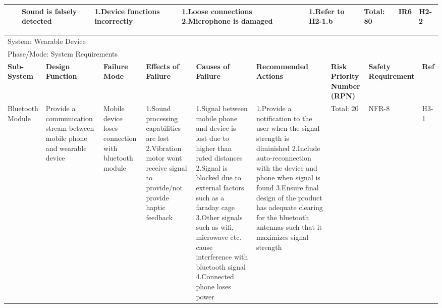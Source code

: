 \documentclass{article}
\begin{document}
\begin{landscape}
\begin{table}[H]
\begin{tabular}{| p{} | p{}  | p{} | p{} | p{} | p{} | p{} | p{} | p{} |}
         & & Sound is falsely detected & 1.Device functions incorrectly & 1.Loose connections \newline 2.Microphone is damaged & 1.Refer to H2-1.b & Total: 80 & IR6 & H2-2 \\ \hline
     
        \end{tabular}
        \hspace*{-1cm}
\end{table}
\begin{table}[H]
    \centering
        
        \begin{tabular}{| p{} | p{}  | p{} | p{} | p{} | p{} | p{} | p{} | p{} |}
        \hline
        
        \multicolumn{9}{|l|}{System: Wearable Device} \\
        \multicolumn{9}{|l|}{Phase/Mode: System Requirements} \\ \hline
        \textbf{Sub-System} & \textbf{Design Function} & \textbf{Failure Mode} & \textbf{Effects of Failure} & \textbf{Causes of Failure} & \textbf{Recommended Actions} & \textbf{Risk Priority Number (RPN)} & \textbf{Safety Requirement} & \textbf{Ref} \\ \hline
    
         Bluetooth Module & Provide a communication stream between mobile phone and wearable device & Mobile device loses connection with  bluetooth module & 1.Sound processing capabilities are lost \newline 2.Vibration motor wont receive signal to provide/not provide haptic feedback  & 1.Signal between mobile phone and  device is lost due to higher than rated distances \newline 2.Signal is blocked due to external factors such as a faraday cage \newline 3.Other signals such as wifi, microwave etc. cause interference with bluetooth signal \newline 4.Connected phone loses power  & 1.Provide a notification to the user when the signal strength is diminished \newline 2.Include auto-reconnection with the device and phone when signal is found \newline 3.Ensure final design of the product has adequate clearing for the bluetooth antennas such that it maximizes signal strength  &  Total: 20 & NFR-8 & H3-1 \\ \cline{3-9}
    

\end{tabular}
\end{table}
\end{landscape}
\end{document}
